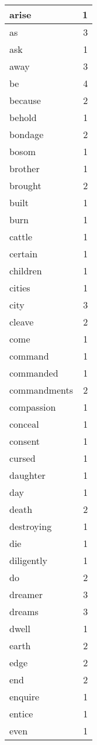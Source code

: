 \begin{center}
\begin{longtable}{l|r}
arise & 1 \\ \hline
as & 3 \\ \hline
ask & 1 \\ \hline
away & 3 \\ \hline
be & 4 \\ \hline
because & 2 \\ \hline
behold & 1 \\ \hline
bondage & 2 \\ \hline
bosom & 1 \\ \hline
brother & 1 \\ \hline
brought & 2 \\ \hline
built & 1 \\ \hline
burn & 1 \\ \hline
cattle & 1 \\ \hline
certain & 1 \\ \hline
children & 1 \\ \hline
cities & 1 \\ \hline
city & 3 \\ \hline
cleave & 2 \\ \hline
come & 1 \\ \hline
command & 1 \\ \hline
commanded & 1 \\ \hline
commandments & 2 \\ \hline
compassion & 1 \\ \hline
conceal & 1 \\ \hline
consent & 1 \\ \hline
cursed & 1 \\ \hline
daughter & 1 \\ \hline
day & 1 \\ \hline
death & 2 \\ \hline
destroying & 1 \\ \hline
die & 1 \\ \hline
diligently & 1 \\ \hline
do & 2 \\ \hline
dreamer & 3 \\ \hline
dreams & 3 \\ \hline
dwell & 1 \\ \hline
earth & 2 \\ \hline
edge & 2 \\ \hline
end & 2 \\ \hline
enquire & 1 \\ \hline
entice & 1 \\ \hline
even & 1 \\ \hline

\end{longtable}
\end{center}
